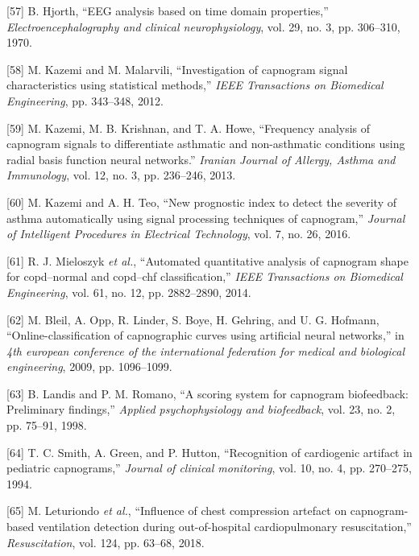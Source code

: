 \documentclass[12pt,]{article}
\begin{document}
\leavevmode\hypertarget{ref-hjorth1970eeg}{}%
{[}57{]} B. Hjorth, ``EEG analysis based on time domain properties,''
\emph{Electroencephalography and clinical neurophysiology}, vol. 29, no.
3, pp. 306--310, 1970.

\leavevmode\hypertarget{ref-kazemi2012investigation}{}%
{[}58{]} M. Kazemi and M. Malarvili, ``Investigation of capnogram signal
characteristics using statistical methods,'' \emph{IEEE Transactions on
Biomedical Engineering}, pp. 343--348, 2012.

\leavevmode\hypertarget{ref-kazemi2013frequency}{}%
{[}59{]} M. Kazemi, M. B. Krishnan, and T. A. Howe, ``Frequency analysis
of capnogram signals to differentiate asthmatic and non-asthmatic
conditions using radial basis function neural networks.'' \emph{Iranian
Journal of Allergy, Asthma and Immunology}, vol. 12, no. 3, pp.
236--246, 2013.

\leavevmode\hypertarget{ref-kazemi2016new}{}%
{[}60{]} M. Kazemi and A. H. Teo, ``New prognostic index to detect the
severity of asthma automatically using signal processing techniques of
capnogram,'' \emph{Journal of Intelligent Procedures in Electrical
Technology}, vol. 7, no. 26, 2016.

\leavevmode\hypertarget{ref-mieloszyk2014automated}{}%
{[}61{]} R. J. Mieloszyk \emph{et al.}, ``Automated quantitative
analysis of capnogram shape for copd--normal and copd--chf
classification,'' \emph{IEEE Transactions on Biomedical Engineering},
vol. 61, no. 12, pp. 2882--2890, 2014.

\leavevmode\hypertarget{ref-bleil2009online}{}%
{[}62{]} M. Bleil, A. Opp, R. Linder, S. Boye, H. Gehring, and U. G.
Hofmann, ``Online-classification of capnographic curves using artificial
neural networks,'' in \emph{4th european conference of the international
federation for medical and biological engineering}, 2009, pp.
1096--1099.

\leavevmode\hypertarget{ref-landis1998scoring}{}%
{[}63{]} B. Landis and P. M. Romano, ``A scoring system for capnogram
biofeedback: Preliminary findings,'' \emph{Applied psychophysiology and
biofeedback}, vol. 23, no. 2, pp. 75--91, 1998.

\leavevmode\hypertarget{ref-smith1994recognition}{}%
{[}64{]} T. C. Smith, A. Green, and P. Hutton, ``Recognition of
cardiogenic artifact in pediatric capnograms,'' \emph{Journal of
clinical monitoring}, vol. 10, no. 4, pp. 270--275, 1994.

\leavevmode\hypertarget{ref-leturiondo2018influence}{}%
{[}65{]} M. Leturiondo \emph{et al.}, ``Influence of chest compression
artefact on capnogram-based ventilation detection during out-of-hospital
cardiopulmonary resuscitation,'' \emph{Resuscitation}, vol. 124, pp.
63--68, 2018.
\end{document}
